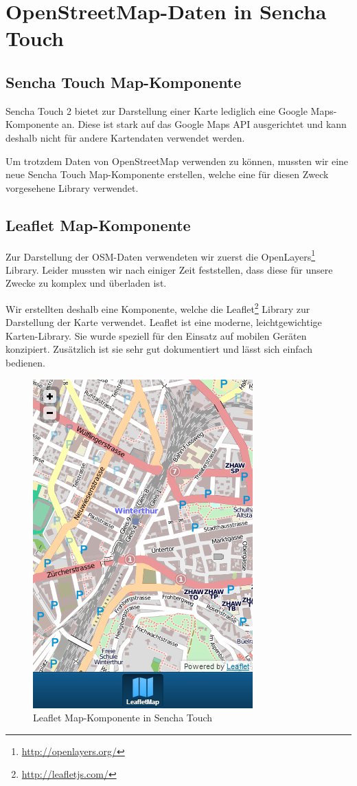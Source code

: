 \chapter{OpenStreetMap-Daten in Sencha Touch}
\label{leaflet-sencha-komponente}

\section{Sencha Touch Map-Komponente}

Sencha Touch 2 bietet zur Darstellung einer Karte lediglich eine Google Maps-Komponente an.
Diese ist stark auf das Google Maps API ausgerichtet und kann deshalb nicht für andere Kartendaten verwendet werden.

Um trotzdem Daten von OpenStreetMap verwenden zu können, mussten wir eine neue Sencha Touch Map-Komponente erstellen, welche eine für diesen Zweck vorgesehene Library verwendet.

\section{Leaflet Map-Komponente}

Zur Darstellung der OSM-Daten verwendeten wir zuerst die OpenLayers\footnote{\url{http://openlayers.org/}} Library.
Leider mussten wir nach einiger Zeit feststellen, dass diese für unsere Zwecke zu komplex und überladen ist.

Wir erstellten deshalb eine Komponente, welche die Leaflet\footnote{\url{http://leafletjs.com/}} Library zur Darstellung der Karte verwendet.
Leaflet ist eine moderne, leichtgewichtige Karten-Library.
Sie wurde speziell für den Einsatz auf mobilen Geräten konzipiert.
Zusätzlich ist sie sehr gut dokumentiert und lässt sich einfach bedienen.

\begin{figure}[H]
	\centering
	\includegraphics[scale=0.5]{images/implementation/leafletmap-screenshot}
	\caption{Leaflet Map-Komponente in Sencha Touch}
	\label{image-leafletmap-screenshot}
\end{figure}

